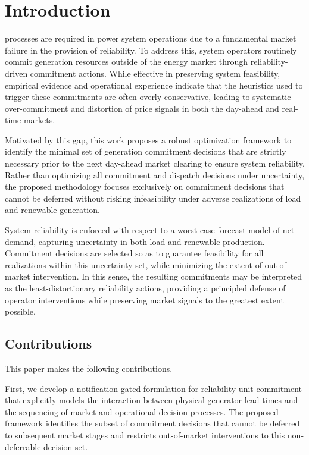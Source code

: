 \documentclass[journal]{IEEEtran}
\begin{document}
\section{Introduction}

 processes are required in power system
operations due to a
fundamental market failure in the provision of reliability. To address
this, system operators routinely commit generation resources outside of
the energy market through reliability-driven commitment actions.
While effective in preserving system feasibility, empirical evidence
and operational experience indicate that the heuristics used to trigger
these commitments are often overly conservative, leading to systematic
over-commitment and distortion of price signals in both the day-ahead
and real-time markets.

Motivated by this gap, this work proposes a robust optimization
framework to identify the minimal set of generation commitment decisions
that are strictly necessary prior to the next day-ahead market clearing
to ensure system reliability. Rather than optimizing all commitment and
dispatch decisions under uncertainty, the proposed methodology focuses
exclusively on commitment decisions that cannot be deferred without
risking infeasibility under adverse realizations of load and renewable
generation.

System reliability is enforced with respect to a worst-case forecast
model of net demand, capturing uncertainty in both load and renewable
production. Commitment decisions are selected so as to guarantee
feasibility for all realizations within this uncertainty set, while
minimizing the extent of out-of-market intervention. In this sense, the
resulting commitments may be interpreted as the least-distortionary
reliability actions, providing a principled defense of operator
interventions while preserving market signals to the greatest extent
possible.

\subsection{Contributions}

This paper makes the following contributions.

First, we develop a notification-gated formulation for reliability unit
commitment that explicitly models the interaction between physical
generator lead times and the sequencing of market and operational
decision processes. The proposed framework identifies the subset of
commitment decisions that cannot be deferred to subsequent market stages
and restricts out-of-market interventions to this non-deferrable
decision set.
\end{document}
